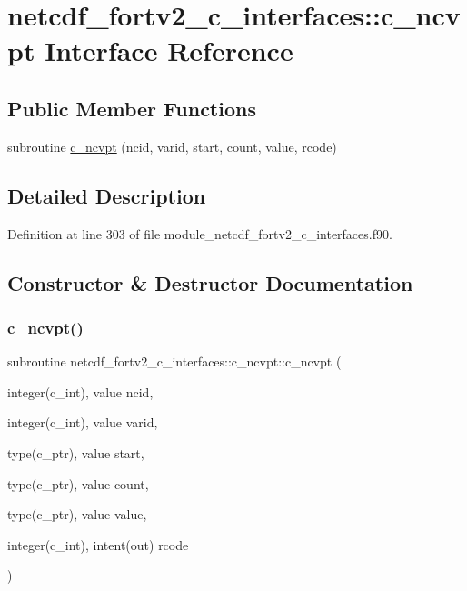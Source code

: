 \hypertarget{interfacenetcdf__fortv2__c__interfaces_1_1c__ncvpt}{}\section{netcdf\+\_\+fortv2\+\_\+c\+\_\+interfaces\+:\+:c\+\_\+ncvpt Interface Reference}
\label{interfacenetcdf__fortv2__c__interfaces_1_1c__ncvpt}
\subsection*{Public Member Functions}
\begin{DoxyCompactItemize}
\item 
subroutine \hyperlink{interfacenetcdf__fortv2__c__interfaces_1_1c__ncvpt_ac771da8fc20d347e60928b9bdf370ca3}{c\+\_\+ncvpt} (ncid, varid, start, count, value, rcode)
\end{DoxyCompactItemize}


\subsection{Detailed Description}


Definition at line 303 of file module\+\_\+netcdf\+\_\+fortv2\+\_\+c\+\_\+interfaces.\+f90.



\subsection{Constructor \& Destructor Documentation}
\mbox{\label{interfacenetcdf__fortv2__c__interfaces_1_1c__ncvpt_ac771da8fc20d347e60928b9bdf370ca3}} 
\subsubsection{\texorpdfstring{c\+\_\+ncvpt()}{c\_ncvpt()}}
{\footnotesize\ttfamily subroutine netcdf\+\_\+fortv2\+\_\+c\+\_\+interfaces\+::c\+\_\+ncvpt\+::c\+\_\+ncvpt (\begin{DoxyParamCaption}\item[{integer(c\+\_\+int), value}]{ncid,  }\item[{integer(c\+\_\+int), value}]{varid,  }\item[{type(c\+\_\+ptr), value}]{start,  }\item[{type(c\+\_\+ptr), value}]{count,  }\item[{type(c\+\_\+ptr), value}]{value,  }\item[{integer(c\+\_\+int), intent(out)}]{rcode }\end{DoxyParamCaption})}



